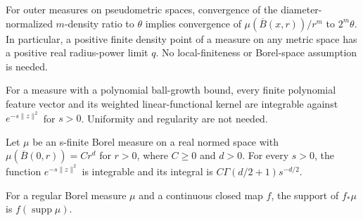 \begin{lemma}
\label{lem:radius-power-density}

For outer measures on pseudometric spaces, convergence of the diameter-normalized $m$-density ratio to $\theta$ implies convergence of $\mu(\overline B(x,r))/r^m$ to $2^m\theta$. In particular, a positive finite density point of a measure on any metric space has a positive real radius-power limit $q$. No local-finiteness or Borel-space assumption is needed.
\end{lemma}

\begin{lemma}
\label{lem:gaussian-feature-integrability}

For a measure with a polynomial ball-growth bound, every finite polynomial feature vector and its weighted linear-functional kernel are integrable against $e^{-s\lVert z\rVert^2}$ for $s>0$. Uniformity and regularity are not needed.
\end{lemma}

\begin{lemma}
\label{lem:gaussian-ball-power-parameter}

Let $\mu$ be an s-finite Borel measure on a real normed space with $\mu(\overline B(0,r))=Cr^d$ for $r>0$, where $C\geq0$ and $d>0$. For every $s>0$, the function $e^{-s\lVert z\rVert^2}$ is integrable and its integral is $C\Gamma(d/2+1)s^{-d/2}$.
\end{lemma}

\begin{lemma}
\label{lem:closed-map-support}

For a regular Borel measure $\mu$ and a continuous closed map $f$, the support of $f_*\mu$ is $f(\operatorname{supp}\mu)$.
\end{lemma}

